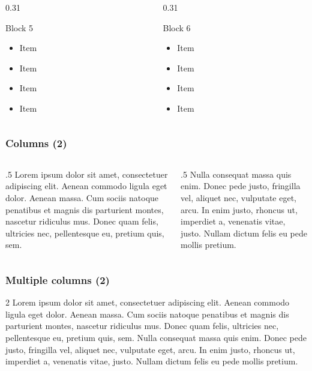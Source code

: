 \begin{frame}[t]
\begin{columns}[T,onlytextwidth]
\begin{column}{0.31\textwidth}
\begin{block}{Block 5}
\begin{itemize}
\item Item
\item Item
\item Item
\item Item
\end{itemize}
\end{block}
\end{column}
\begin{column}{0.31\textwidth}
\begin{block}{Block 6}
\begin{itemize}
\item Item
\item Item
\item Item
\item Item
\end{itemize}
\end{block}
\end{column}
\end{columns}
\end{frame}

\begin{frame}
\frametitle{Columns (2)}
\begin{columns}
\begin{column}[t]{.5\textwidth}
\justifying
Lorem ipsum dolor sit amet, consectetuer adipiscing elit. Aenean commodo ligula eget dolor. Aenean massa. Cum sociis natoque penatibus et magnis dis parturient montes, nascetur ridiculus mus. Donec quam felis, ultricies nec, pellentesque eu, pretium quis, sem.
\end{column}
\begin{column}[t]{.5\textwidth}
\justifying
Nulla consequat massa quis enim. Donec pede justo, fringilla vel, aliquet nec, vulputate eget, arcu. In enim justo, rhoncus ut, imperdiet a, venenatis vitae, justo. Nullam dictum felis eu pede mollis pretium.
\end{column}%
\end{columns}
\end{frame}

\begin{frame}
\frametitle{Multiple columns (2)}
\setlength\columnsep{30pt}
\begin{multicols}{2}
\justifying
Lorem ipsum dolor sit amet, consectetuer adipiscing elit. Aenean commodo ligula eget dolor. Aenean massa. Cum sociis natoque penatibus et magnis dis parturient montes, nascetur ridiculus mus. Donec quam felis, ultricies nec, pellentesque eu, pretium quis, sem. Nulla consequat massa quis enim. Donec pede justo, fringilla vel, aliquet nec, vulputate eget, arcu. In enim justo, rhoncus ut, imperdiet a, venenatis vitae, justo. Nullam dictum felis eu pede mollis pretium.
\end{multicols}
\end{frame}

